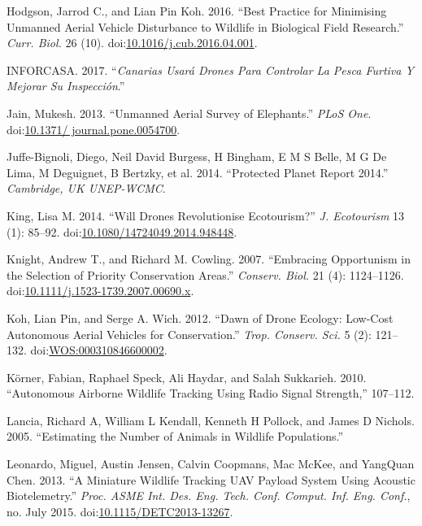 \documentclass[]{interact}
\theoremstyle{plain}%
\theoremstyle{definition}
\theoremstyle{remark}
\begin{document}
\hypertarget{ref-hodgson_best_2016}{}
Hodgson, Jarrod C., and Lian Pin Koh. 2016. ``Best Practice for
Minimising Unmanned Aerial Vehicle Disturbance to Wildlife in Biological
Field Research.'' \emph{Curr. Biol.} 26 (10).
doi:\href{https://doi.org/10.1016/j.cub.2016.04.001}{10.1016/j.cub.2016.04.001}.

\hypertarget{ref-Canarias2017}{}
INFORCASA. 2017. ``\emph{Canarias Usará Drones Para Controlar La Pesca
Furtiva Y Mejorar Su Inspección}.''

\hypertarget{ref-jain_unmanned_2013}{}
Jain, Mukesh. 2013. ``Unmanned Aerial Survey of Elephants.'' \emph{PLoS
One}.
doi:\href{https://doi.org/10.1371/\%20journal.pone.0054700}{10.1371/ journal.pone.0054700}.

\hypertarget{ref-juffe-bignoli_protected_2014}{}
Juffe-Bignoli, Diego, Neil David Burgess, H Bingham, E M S Belle, M G De
Lima, M Deguignet, B Bertzky, et al. 2014. ``Protected Planet Report
2014.'' \emph{Cambridge, UK UNEP-WCMC}.

\hypertarget{ref-king_will_2014}{}
King, Lisa M. 2014. ``Will Drones Revolutionise Ecotourism?'' \emph{J.
Ecotourism} 13 (1): 85--92.
doi:\href{https://doi.org/10.1080/14724049.2014.948448}{10.1080/14724049.2014.948448}.

\hypertarget{ref-knight_embracing_2007}{}
Knight, Andrew T., and Richard M. Cowling. 2007. ``Embracing Opportunism
in the Selection of Priority Conservation Areas.'' \emph{Conserv. Biol.}
21 (4): 1124--1126.
doi:\href{https://doi.org/10.1111/j.1523-1739.2007.00690.x}{10.1111/j.1523-1739.2007.00690.x}.

\hypertarget{ref-koh_dawn_2012}{}
Koh, Lian Pin, and Serge A. Wich. 2012. ``Dawn of Drone Ecology:
Low-Cost Autonomous Aerial Vehicles for Conservation.'' \emph{Trop.
Conserv. Sci.} 5 (2): 121--132.
doi:\href{https://doi.org/WOS:000310846600002}{WOS:000310846600002}.

\hypertarget{ref-korner_autonomous_2010}{}
Körner, Fabian, Raphael Speck, Ali Haydar, and Salah Sukkarieh. 2010.
``Autonomous Airborne Wildlife Tracking Using Radio Signal Strength,''
107--112.

\hypertarget{ref-lancia_estimating_2005}{}
Lancia, Richard A, William L Kendall, Kenneth H Pollock, and James D
Nichols. 2005. ``Estimating the Number of Animals in Wildlife
Populations.''

\hypertarget{ref-leonardo_miniature_2013}{}
Leonardo, Miguel, Austin Jensen, Calvin Coopmans, Mac McKee, and
YangQuan Chen. 2013. ``A Miniature Wildlife Tracking UAV Payload System
Using Acoustic Biotelemetry.'' \emph{Proc. ASME Int. Des. Eng. Tech.
Conf. Comput. Inf. Eng. Conf.}, no. July 2015.
doi:\href{https://doi.org/10.1115/DETC2013-13267}{10.1115/DETC2013-13267}.
\end{document}
